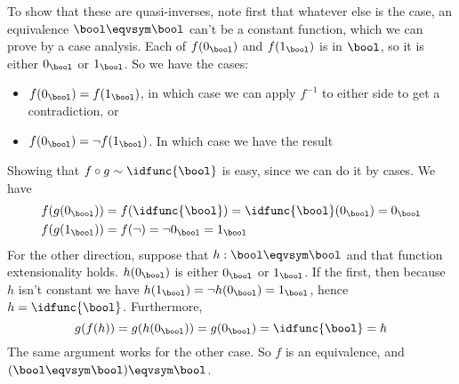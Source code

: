To show that these are quasi-inverses,
note first that whatever else is the case, an equivalence
$\bool \eqvsym \bool$ can't be a constant function, which we can prove by a case
analysis.  Each of $f(0_{\bool})$ and $f(1_{\bool})$ is in $\bool$, so it is
either $0_{\bool}$ or $1_{\bool}$.  So we have the cases:



\begin{itemize}
\item  $f(0_{\bool}) = f(1_{\bool})$, in which case we can apply $f^{-1}$ to either side to get a contradiction, or

\item  $f(0_{\bool}) = \lnot f(1_{\bool})$. In which case we have the result

\end{itemize}
Showing that $f \circ g \sim \idfunc{\bool}$ is easy, since we can do it by
cases.  We have
\begin{align*}
  f(g(0_{\bool})) &= f(\idfunc{\bool}) = \idfunc{\bool}(0_{\bool}) = 0_{\bool}
  \\
  f(g(1_{\bool})) &= f(\lnot) = \lnot 0_{\bool} = 1_{\bool}
\end{align*}
For the other direction, suppose that $h : \bool \eqvsym \bool$ and that
function extensionality holds.
$h(0_{\bool})$ is either $0_{\bool}$ or $1_{\bool}$.  If the first, then
because $h$ isn't constant we have $h(1_{\bool}) = \lnot h(0_{\bool}) =
1_{\bool}$, hence $h = \idfunc{\bool}$.  Furthermore,
\[
  g(f(h)) = g(h(0_{\bool})) = g(0_{\bool}) = \idfunc{\bool} = h
\]
The same argument works for the other case.  So $f$ is an equivalence, and
$(\bool \eqvsym \bool) \eqvsym \bool$.


